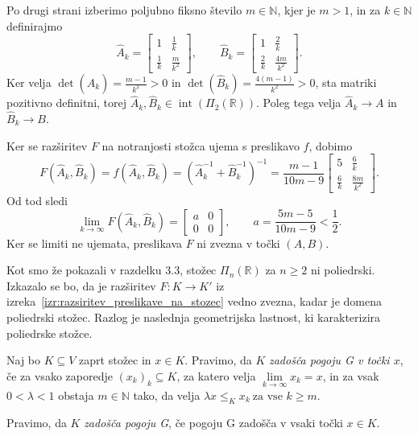 \documentclass[mat2, tisk]{fmfdelo}
\newcommand{\R}{\mathbb{R}}
\newcommand{\N}{\mathbb{N}}
\begin{document}
\begin{zgled}
Po drugi strani izberimo poljubno fiksno število $m\in\N$, kjer je $m>1$, in za
$k\in\N$ definirajmo
\begin{equation*}
\widehat{A}_k=
\begin{bmatrix}
1&\frac1k\\
\frac1k&\frac{m}{k^2}
\end{bmatrix},
\qquad
\widehat{B}_k=
\begin{bmatrix}
1&\frac2k\\
\frac2k&\frac{4m}{k^2}
\end{bmatrix}.
\end{equation*}
Ker velja
$\det(\widehat{A}_k)=\frac{m-1}{k^2}>0$ in
$\det(\widehat{B}_k)=\frac{4(m-1)}{k^2}>0$,
sta matriki pozitivno definitni, torej
$\widehat{A}_k,\widehat{B}_k\in\operatorname{int}(\Pi_2(\R))$.
Poleg tega velja $\widehat{A}_k\to A$ in $\widehat{B}_k\to B$.

Ker se razširitev $F$ na notranjosti stožca ujema s preslikavo $f$, dobimo
\[
F(\widehat{A}_k,\widehat{B}_k)
=f(\widehat{A}_k,\widehat{B}_k)
=(\widehat{A}_k^{-1}+\widehat{B}_k^{-1})^{-1}
=\frac{m-1}{10m-9}
\begin{bmatrix}
5&\frac6k\\
\frac6k&\frac{8m}{k^2}
\end{bmatrix}.
\]
Od tod sledi
\[
\lim\limits_{k\to\infty}F(\widehat{A}_k,\widehat{B}_k)
=
\begin{bmatrix}
a&0\\
0&0
\end{bmatrix},
\qquad
a=\frac{5m-5}{10m-9}<\frac12.
\]
Ker se limiti ne ujemata, preslikava $F$ ni zvezna v točki $(A,B)$.
\end{zgled}

Kot smo že pokazali v razdelku 3.3, stožec
$\Pi_n(\R)$ za $n\geq2$ ni poliedrski. Izkazalo se bo, da je razširitev
$F: K \to K'$ iz izreka~\ref{izr:razsiritev_preslikave_na_stozec} vedno
zvezna, kadar je domena poliedrski stožec. Razlog je naslednja
geometrijska lastnost, ki karakterizira poliedrske stožce.

\begin{definicija}\label{def:pogoj_G}
Naj bo $K\subseteq V$ zaprt stožec in $x\in K$. Pravimo, da $K$
\emph{zadošča pogoju G v točki $x$}, če za vsako zaporedje
$(x_k)_k\subseteq K$, za katero velja
$\lim\limits_{k\to\infty}x_k=x$, in za
vsak $0<\lambda<1$ obstaja $m\in\N$ tako, da velja 
$\lambda x\leq_K x_k~\text{za vse }k\geq m$.

Pravimo, da $K$ \emph{zadošča pogoju G}, če pogoju G zadošča v vsaki
točki $x\in K$.
\end{definicija}
\end{document}
